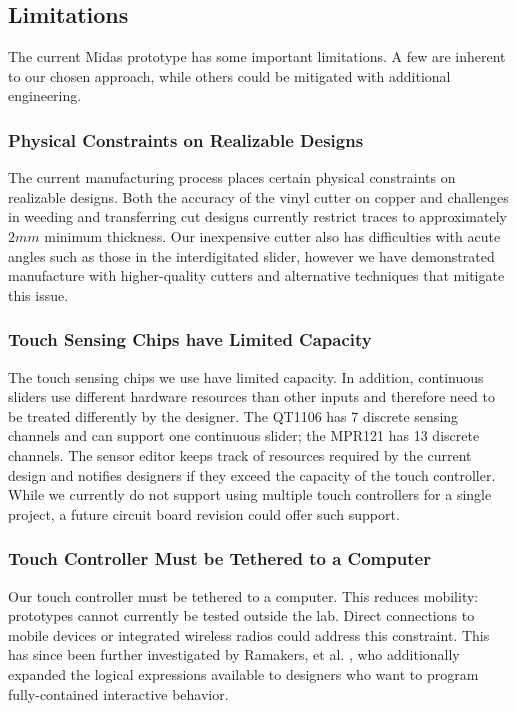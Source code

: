     \subsection{Limitations}
    
    The current Midas prototype has some important limitations. A few are inherent to our chosen approach, while others could be mitigated with additional engineering.

\subsubsection{Physical Constraints on Realizable Designs}
The current manufacturing process places certain physical constraints on realizable designs. Both the accuracy of the vinyl cutter on copper and challenges in weeding and transferring cut designs currently restrict traces to approximately $2mm$ minimum thickness. Our inexpensive cutter also has difficulties with acute angles such as those in the interdigitated slider, however we have demonstrated manufacture with higher-quality cutters and alternative techniques that mitigate this issue.

\subsubsection{Touch Sensing Chips have Limited Capacity}
The touch sensing chips we use have limited capacity. In addition, continuous sliders use different hardware resources than other inputs and therefore need to be treated differently by the designer. The QT1106 has 7 discrete sensing channels and can support one continuous slider; the MPR121 has 13 discrete channels. The sensor editor keeps track of resources required by the current design and notifies designers if they exceed the capacity of the touch controller. While we currently do not support using multiple touch controllers for a single project, a future circuit board revision could offer such support. 

\subsubsection{Touch Controller Must be Tethered to a Computer}
Our touch controller must be tethered to a computer. This reduces mobility: prototypes cannot currently be tested outside the lab. Direct connections to mobile devices or integrated wireless radios could address this constraint. This has since been further investigated by Ramakers, et al. \cite{ramakers-paperpulse}, who additionally expanded the logical expressions available to designers who want to program fully-contained interactive behavior.

